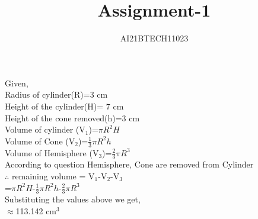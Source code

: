 \documentclass[12pt]{article}
\begin{document}
\title{Assignment-1}
\author{AI21BTECH11023}
\maketitle
Given,\\
Radius of cylinder(R)=3 cm\\
Height of the cylinder(H)= 7 cm\\
Height of the cone removed(h)=3 cm\\
Volume of cylinder (V\(_1\))=\(\pi R^2 H\)\\
Volume of Cone (V\(_2\))=\(\frac{1}{3} \pi R^2 h\)\\
Volume of Hemisphere (V\(_3\))=\(\frac{2}{3} \pi R^3\)\\
According to question Hemisphere, Cone are removed from Cylinder\\
\(\therefore\) remaining volume = V\(_1\)-V\(_2\)-V\(_3\)\\
=\(\pi R^2 H\)-\(\frac{1}{3} \pi R^2 h\)-\(\frac{2}{3} \pi R^3\)\\
Substituting the values above we get,\\
\(\approx\)113.142 cm\(^3\)
\end{document}
